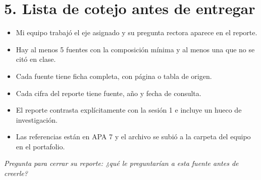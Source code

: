 \documentclass[11pt,letterpaper]{article}
\begin{document}
\section*{5. Lista de cotejo antes de entregar}

\begin{itemize}[leftmargin=1.6em, label=$\square$, itemsep=2pt]
  \item Mi equipo trabajó el eje asignado y su pregunta rectora aparece en el reporte.
  \item Hay al menos 5 fuentes con la composición mínima y al menos una que no se citó en clase.
  \item Cada fuente tiene ficha completa, con página o tabla de origen.
  \item Cada cifra del reporte tiene fuente, año y fecha de consulta.
  \item El reporte contrasta explícitamente con la sesión 1 e incluye un hueco de investigación.
  \item Las referencias están en APA 7 y el archivo se subió a la carpeta del equipo en el portafolio.
\end{itemize}

\vspace{0.3cm}
\begin{center}
\small\textit{Pregunta para cerrar su reporte: ¿qué le preguntarían a esta fuente antes de creerle?}
\end{center}
\end{document}
